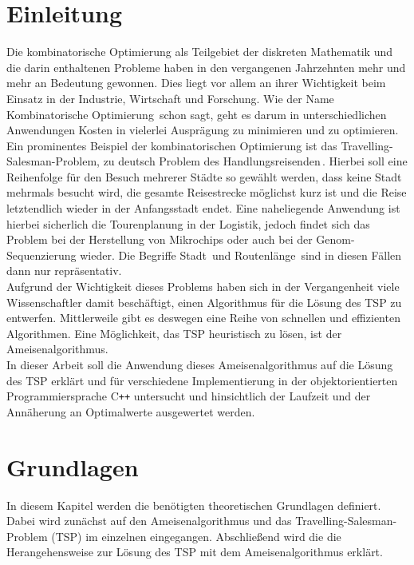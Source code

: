 \documentclass[doktyp=barbeit, sprache=german]{TUBAFarbeiten}
\begin{document}
\maketitle
\TUBAFErklaerungsseite
\tableofcontents
\newpage
\section{Einleitung}
Die kombinatorische Optimierung als Teilgebiet der diskreten Mathematik und die darin enthaltenen Probleme haben in den vergangenen Jahrzehnten mehr und mehr an Bedeutung gewonnen. Dies liegt vor allem an ihrer Wichtigkeit beim Einsatz in der Industrie, Wirtschaft und Forschung. Wie der Name \glqq Kombinatorische Optimierung\grqq\, schon sagt, geht es darum in unterschiedlichen Anwendungen Kosten in vielerlei Ausprägung zu minimieren und zu optimieren. 
\\Ein prominentes Beispiel der kombinatorischen Optimierung ist das Travelling-Salesman-Problem, zu deutsch \glqq Problem des Handlungsreisenden\grqq\,. Hierbei soll eine Reihenfolge für den Besuch mehrerer Städte so gewählt werden, dass keine Stadt mehrmals besucht wird, die gesamte Reisestrecke möglichst kurz ist und die Reise letztendlich wieder in der Anfangsstadt endet. Eine naheliegende Anwendung ist hierbei sicherlich die Tourenplanung in der Logistik, jedoch findet sich das Problem bei der Herstellung von Mikrochips oder auch bei der Genom-Sequenzierung wieder. Die Begriffe \glqq Stadt\grqq\, und \glqq Routenlänge\grqq\, sind in diesen Fällen dann nur repräsentativ.
\\Aufgrund der Wichtigkeit dieses Problems haben sich in der Vergangenheit viele Wissenschaftler damit beschäftigt, einen Algorithmus für die Lösung des TSP zu entwerfen. Mittlerweile gibt es deswegen eine Reihe von schnellen und effizienten Algorithmen. Eine Möglichkeit, das TSP heuristisch zu lösen, ist der Ameisenalgorithmus.
\\In dieser Arbeit soll die Anwendung dieses Ameisenalgorithmus auf die Lösung des TSP erklärt und für verschiedene Implementierung in der objektorientierten Programmiersprache C\texttt{++} untersucht und hinsichtlich der Laufzeit und der Annäherung an Optimalwerte ausgewertet werden.
\section{Grundlagen}
In diesem Kapitel werden die benötigten theoretischen Grundlagen definiert. Dabei wird zunächst auf den Ameisenalgorithmus und das Travelling-Salesman-Problem (TSP) im einzelnen eingegangen. Abschließend wird die die Herangehensweise zur Lösung des TSP mit dem Ameisenalgorithmus erklärt.
\end{document}
